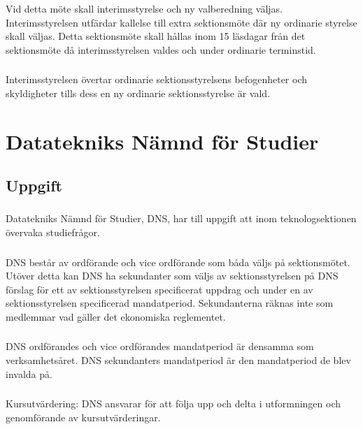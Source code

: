 \documentclass[a4paper]{dtek}
\begin{document}
\subsubsection{}
Vid detta möte skall interimsstyrelse och ny valberedning väljas. Interimsstyrelsen utfärdar kallelse till extra sektionsmöte där ny ordinarie styrelse skall väljas. Detta sektionsmöte skall hållas inom 15 läsdagar från det sektionsmöte då interimsstyrelsen valdes och under ordinarie terminstid.
\subsubsection{}
Interimsstyrelsen övertar ordinarie sektionsstyrelsens befogenheter och skyldigheter tills dess en ny ordinarie sektionsstyrelse är vald.
\newpage

\section{Datatekniks Nämnd för Studier}
\subsection{Uppgift}
\subsubsection{}
Datatekniks Nämnd för Studier, DNS, har till uppgift att inom teknologsektionen övervaka studiefrågor.
\subsubsection{}
DNS består av ordförande och vice ordförande som båda väljs på sektionsmötet. Utöver detta kan DNS ha sekundanter som väljs av sektionsstyrelsen på DNS förslag för ett av sektionsstyrelsen specificerat uppdrag och under en av sektionsstyrelsen specificerad mandatperiod. Sekundanterna räknas inte som medlemmar vad gäller det ekonomiska reglementet.
\subsubsection{}
DNS ordförandes och vice ordförandes mandatperiod är densamma som verksamhetsåret. DNS sekundanters mandatperiod är den mandatperiod de blev invalda på.
\subsubsection{}
Kursutvärdering: DNS ansvarar för att följa upp och delta i utformningen och genomförande av kursutvärderingar.
\end{document}

